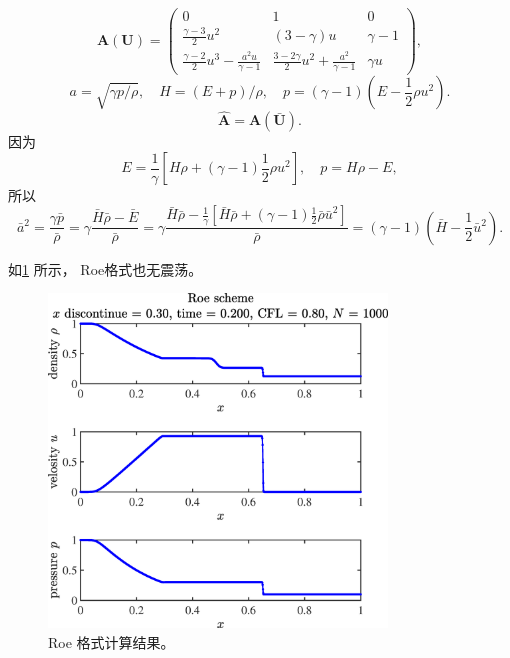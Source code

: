\documentclass[12pt]{article}
\begin{document}
\begin{equation}
	\boldsymbol{A}(\boldsymbol{U})=\left(\begin{array}{ccc}
			0                                                 & 1                                                 & 0        \\
			\frac{\gamma-3}{2} u^{2}                          & (3-\gamma) u                                      & \gamma-1 \\
			\frac{\gamma-2}{2} u^{3}-\frac{a^{2} u}{\gamma-1} & \frac{3-2 \gamma}{2} u^{2}+\frac{a^{2}}{\gamma-1} & \gamma u
		\end{array}\right),
\end{equation}
\begin{equation}
	a=\sqrt{\gamma p / \rho},\quad H=(E+p) / \rho,\quad p=(\gamma-1)\left(E-\frac{1}{2} \rho u^{2}\right).
\end{equation}
\begin{equation}
	\hat{\bm{A}}=\bm{A}(\bm{\bar{U}}).
\end{equation}
因为
\begin{equation}
	E=\frac{1}{\gamma}\left[H\rho+(\gamma-1)\frac{1}{2}\rho u^2\right],\quad p=H\rho - E,
\end{equation}
所以
\begin{equation}
	\bar{a}^2 = \frac{\gamma \bar{p}}{\bar{\rho}} = \gamma\frac{ \bar{H}\bar{\rho} - \bar{E}}{\bar{\rho}} = \gamma\frac{ \bar{H}\bar{\rho} - \frac{1}{\gamma}\left[\bar{H}\bar{\rho}+(\gamma-1)\frac{1}{2}\bar{\rho} \bar{u}^2\right]}{\bar{\rho}} =(\gamma-1) \left(\bar{H}-\frac{1}{2}\bar{u}^2\right).
\end{equation}


如\cref{fig:2Roe} 所示， Roe格式也无震荡。

\begin{figure}[htp]
	\centering
	\includegraphics[width=9cm]{2Roe.eps}
	\vspace{20pt}
	\caption{Roe 格式计算结果。}
	\label{fig:2Roe}
\end{figure}
\end{document}
